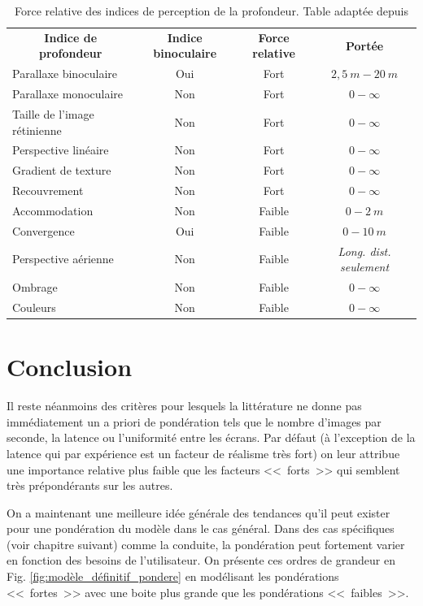 \begin{table}[h]	
	\centering
	\caption{Force relative des indices de perception de la profondeur. Table adaptée depuis \citep{mehrabi_making_2013}}
	\label{tab:ponderation_depth_cues}
	\small
	\begin{tabular}{lccc}
		\multicolumn{1}{c}{\bfseries Indice de profondeur} & \multicolumn{1}{c}{\bfseries Indice binoculaire} & \multicolumn{1}{c}{\bfseries Force relative} & \multicolumn{1}{c}{\bfseries Portée}\\		
		Parallaxe binoculaire & Oui & Fort & $2,5~m - 20~m$\\
		Parallaxe monoculaire & Non & Fort & $0 - \infty$\\
		Taille de l'image rétinienne & Non & Fort & $0 - \infty$\\
		Perspective linéaire & Non & Fort & $0 - \infty$\\
		Gradient de texture & Non & Fort & $0 - \infty$\\
		Recouvrement & Non & Fort & $0 - \infty$\\
		Accommodation & Non & Faible & $0 - 2~m$\\
		Convergence & Oui & Faible & $0 - 10~m$\\
		Perspective aérienne & Non & Faible & \textit{Long. dist. seulement}\\
		Ombrage & Non & Faible & $0 - \infty$\\
		Couleurs & Non & Faible & $0 - \infty$\\
	\end{tabular}
\end{table}

\section{Conclusion}
\par Il reste néanmoins des critères pour lesquels la littérature ne donne pas immédiatement un a priori de pondération tels que le nombre d'images par seconde, la latence ou l'uniformité entre les écrans. Par défaut (à l'exception de la latence qui par expérience est un facteur de réalisme très fort) on leur attribue une importance relative plus faible que les facteurs <<~forts~>> qui semblent très prépondérants sur les autres.

\par On a maintenant une meilleure idée générale des tendances qu'il peut exister pour une pondération du modèle dans le cas général. Dans des cas spécifiques (voir chapitre suivant) comme la conduite, la pondération peut fortement varier en fonction des besoins de l'utilisateur. On présente ces ordres de grandeur en Fig. \ref{fig:modèle_définitif_pondere} en modélisant les pondérations <<~fortes~>> avec une boite plus grande que les pondérations <<~faibles~>>.

